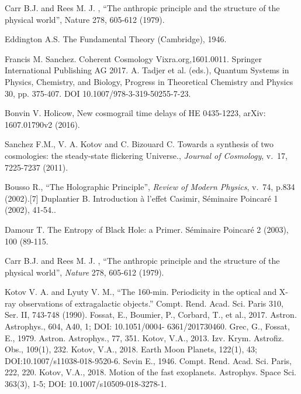 \documentclass[twoside,draft]{article}
\begin{document}
\begin{sloppypar}
{\begin{thebibliography}{99}\footnotesize



 Carr B.J. and Rees M. J. , “The anthropic principle and the structure of the physical world”,
Nature 278, 605-612 (1979). %

 Eddington A.S. The Fundamental Theory (Cambridge), 1946.

 Francis M. Sanchez. Coherent Cosmology Vixra.org,1601.0011. Springer International Publishing AG
2017. A. Tadjer et al. (eds.), Quantum Systems in Physics, Chemistry, and Biology, Progress in
Theoretical Chemistry and Physics 30, pp. 375-407. DOI 10.1007/978-3-319-50255-7-23. %

 Bonvin V. Holicow, New cosmograil time delays of HE 0435-1223, arXiv: 1607.01790v2
(2016). %

 Sanchez F.M., V. A. Kotov and C. Bizouard C. Towards a synthesis of two cosmologies: the
steady-state flickering Universe., \textit{Journal of Cosmology}, v.\, 17, 7225-7237 (2011). %

 Bousso R., “The Holographic Principle”, \textit{Review of Modern Physics}, v.\, 74, p.834 (2002).[7] Duplantier B. Introduction à l'effet Casimir, Séminaire Poincaré 1 (2002), 41-54.. %

 Damour T. The Entropy of Black Hole: a Primer. Séminaire Poincaré 2 (2003), 100 (89-115. %

 Carr B.J. and Rees M. J. , “The anthropic principle and the structure of the physical world”,
\textit{Nature} 278, 605-612 (1979). %

 Kotov V. A. and Lyuty V. M., “The 160-min. Periodicity in the optical and X-ray observations of
extragalactic objects.” Compt. Rend. Acad. Sci. Paris 310, Ser. II, 743-748 (1990). Fossat, E.,
Boumier, P., Corbard, T., et al., 2017. Astron. Astrophys., 604, A40, 1; DOI: 10.1051/0004-
6361/201730460. Grec, G., Fossat, E., 1979. Astron. Astrophys., 77, 351. Kotov, V.A., 2013.
Izv. Krym. Astrofiz. Obs., 109(1), 232. Kotov, V.A., 2018. Earth Moon Planets, 122(1), 43;
DOI:10.1007/s11038-018-9520-6. Sevin E., 1946. Compt. Rend. Acad. Sci. Paris, 222, 220.
Kotov, V.A., 2018. Motion of the fast exoplanets. Astrophys. Space Sci. 363(3), 1-5; DOI:
10.1007/s10509-018-3278-1. %


\end{thebibliography}}
\end{sloppypar}
\end{document}

